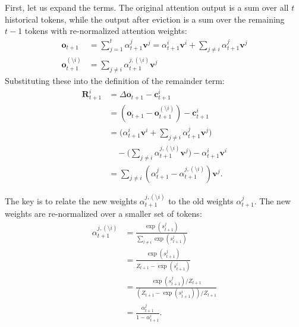 First, let us expand the terms. The original attention output is a sum over all \(t\) historical tokens, while the output after eviction is a sum over the remaining \(t-1\) tokens with re-normalized attention weights:
\begin{align*}
    \mathbf{o}_{t+1} &= \sum_{j=1}^{t} \alpha_{t+1}^j \mathbf{v}^j = \alpha_{t+1}^i \mathbf{v}^i + \sum_{j \neq i} \alpha_{t+1}^j \mathbf{v}^j \\
    \mathbf{o}_{t+1}^{(\setminus i)} &= \sum_{j \neq i} \alpha_{t+1}^{j, (\setminus i)} \mathbf{v}^j
\end{align*}
Substituting these into the definition of the remainder term:
\begin{align*}
    \mathbf{R}_{t+1}^i &= \Delta\mathbf{o}_{t+1} - \mathbf{c}_{t+1}^i \\
    &= \left( \mathbf{o}_{t+1} - \mathbf{o}_{t+1}^{(\setminus i)} \right) - \mathbf{c}_{t+1}^i \\
    &= \biggl( \alpha_{t+1}^i \mathbf{v}^i + \sum_{j \neq i} \alpha_{t+1}^j \mathbf{v}^j \biggr) \\
    &\quad - \biggl( \sum_{j \neq i} \alpha_{t+1}^{j, (\setminus i)} \mathbf{v}^j \biggr) - \alpha_{t+1}^i \mathbf{v}^i \\
    &= \sum_{j \neq i} \left( \alpha_{t+1}^j - \alpha_{t+1}^{j, (\setminus i)} \right) \mathbf{v}^j.
\end{align*}

The key is to relate the new weights \( \alpha_{t+1}^{j, (\setminus i)} \) to the old weights \( \alpha_{t+1}^j \). The new weights are re-normalized over a smaller set of tokens:
\begin{equation}
\begin{split}
    \alpha_{t+1}^{j, (\setminus i)} &= \frac{\exp(s_{t+1}^j)}{\sum_{l \neq i} \exp(s_{t+1}^l)} \\
    &= \frac{\exp(s_{t+1}^j)}{Z_{t+1} - \exp(s_{t+1}^i)} \\
    &= \frac{\exp(s_{t+1}^j)/Z_{t+1}}{(Z_{t+1} - \exp(s_{t+1}^i))/Z_{t+1}} \\
    &= \frac{\alpha_{t+1}^j}{1 - \alpha_{t+1}^i}.
\end{split}
\end{equation}

